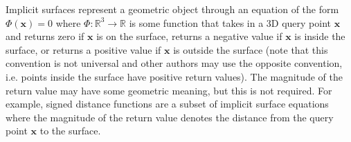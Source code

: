 \documentclass[acmtog]{acmart}
\begin{document}
Implicit surfaces represent a geometric object through an equation of the form $\Phi(\mathbf{x}) = 0$ where $\Phi: \mathbb{R}^3 \rightarrow \mathbb{R}$ is some function that takes in a 3D query point $\mathbf{x}$ and returns zero if $\mathbf{x}$ is on the surface, returns a negative value if $\mathbf{x}$ is inside the surface, or returns a positive value if $\mathbf{x}$ is outside the surface (note that this convention is not universal and other authors may use the opposite convention, i.e. points inside the surface have positive return values). The magnitude of the return value may have some geometric meaning, but this is not required. For example, signed distance functions are a subset of implicit surface equations where the magnitude of the return value denotes the distance from the query point $\mathbf{x}$ to the surface.
\end{document}
